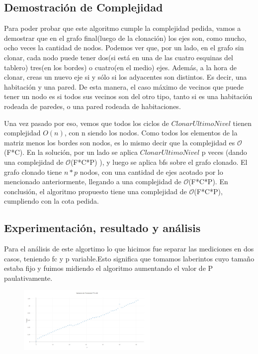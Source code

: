 \documentclass[spanish,12pt]{article}
\begin{document}
\subsection{Demostración de Complejidad}
Para poder probar que este algoritmo cumple la complejidad pedida, vamos a demostrar que en el grafo final(luego de la clonación) los ejes son, como mucho, ocho veces la cantidad de nodos.
Podemos ver que, por un lado, en el grafo sin clonar, cada nodo puede tener dos(si está en una de las cuatro esquinas del tablero) tres(en los bordes) o cuatro(en el medio) ejes. Además, a la hora de clonar, creas un nuevo eje si y sólo si los adyacentes son distintos. Es decir, una habitación y una pared. De esta manera, el caso máximo de vecinos que puede tener un nodo es si todos sus vecinos son del otro tipo, tanto si es una habitación rodeada de paredes, o una pared rodeada de habitaciones.

Una vez pasado por eso, vemos que todos los ciclos de $ClonarUltimoNivel$ tienen complejidad $O(n)$, con n siendo los nodos. Como todos los elementos de la matriz menos los bordes son nodos, es lo mismo decir que la complejidad es $\mathcal{O}$(F*C). En la solución, por un lado se aplica $ClonarUltimoNivel$ p veces (dando una complejidad de $\mathcal{O}$(F*C*P) ), y luego se aplica bfs sobre el grafo clonado. El grafo clonado tiene $n*p$ nodos, con una cantidad de ejes acotado por lo mencionado anteriormente, llegando a una complejidad de $\mathcal{O}$(F*C*P). En conclusión, el algoritmo propuesto tiene una complejidad de $\mathcal{O}$(F*C*P), cumpliendo con la cota pedida.
\subsection{Experimentación, resultado y análisis }
Para el análisis de este algortimo lo que hicimos fue separar las mediciones en dos casos, teniendo fc y p variable.Esto significa que tomamos laberintos cuyo tamaño estaba fijo y fuimos midiendo el algoritmo
aumentando el valor de P paulativamente.



\begin{figure}[H]
\centering
\includegraphics     [width=0.6\textwidth]{fcfijo}
\caption{}
\end{figure}
\end{document}
